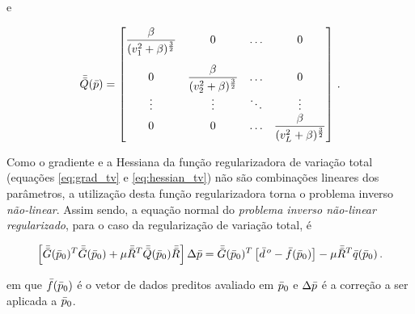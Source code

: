 \noindent e

\begin{equation}
\mat{Q}(\vect{p}) =
    \begin{bmatrix}
    \dfrac{\beta}{(v_1^2 + \beta)^{\frac{3}{2}}} & 0 & \ldots & 0 \vspace{0.3cm}\\
    0 & \dfrac{\beta}{(v_2^2 + \beta)^{\frac{3}{2}}} & \ldots & 0 \\
    \vdots & \vdots & \ddots & \vdots \\
    0 & 0 & \ldots & \dfrac{\beta}{(v_L^2 + \beta)^{\frac{3}{2}}}
    \end{bmatrix} \thinspace .
\end{equation}

\indent Como o gradiente e a Hessiana da função regularizadora de variação
total (equações \ref{eq:grad_tv} e \ref{eq:hessian_tv}) não são combinações
lineares dos parâmetros, a utilização desta função regularizadora torna o
problema inverso {\it não-linear}. Assim sendo, a equação normal do
{\it problema inverso não-linear regularizado}, para o caso da regularização de
variação total, é

\begin{equation}
\left[\bar{\bar{G}}(\bar{p}_0)^T\bar{\bar{G}}(\bar{p}_0) +
      \mu\bar{\bar{R}}^T \bar{\bar{Q}}(\bar{p}_0)\bar{\bar{R}}\right]\Delta\bar{p} =
\bar{\bar{G}}(\bar{p}_0)^T \left[\bar{d}^{\thinspace o} - \bar{f}(\bar{p}_0)\right] -
\mu\bar{\bar{R}}^T \bar{q}(\bar{p}_0)
    \thinspace .
\end{equation}

\noindent em que $\bar{f}(\bar{p}_0)$ é o vetor de dados preditos avaliado em
$\bar{p}_0$ e $\Delta\bar{p}$ é a correção a ser aplicada a $\bar{p}_0$.


